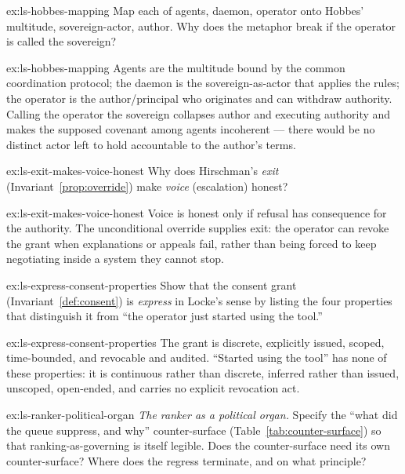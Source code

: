 \documentclass[11pt,a4paper]{article}
\theoremstyle{definition}
\theoremstyle{plain}
\newcounter{protocol}[section]
\begin{document}
\begin{pdexercise}[kind=Check,rating=1]{ex:ls-hobbes-mapping}
Map each of {agents, daemon, operator} onto Hobbes' {multitude, sovereign-actor,
author}. Why does the metaphor break if the operator is called the sovereign?
\end{pdexercise}
\begin{pdsolution}{ex:ls-hobbes-mapping}
Agents are the multitude bound by the common coordination protocol; the daemon is the sovereign-as-actor that applies the rules; the operator is the author/principal who originates and can withdraw authority. Calling the operator the sovereign collapses author and executing authority and makes the supposed covenant among agents incoherent --- there would be no distinct actor left to hold accountable to the author's terms.
\end{pdsolution}
\begin{pdexercise}[kind=Check,rating=1]{ex:ls-exit-makes-voice-honest}
Why does Hirschman's \emph{exit} (Invariant~\ref{prop:override}) make \emph{voice}
(escalation) honest?
\end{pdexercise}
\begin{pdsolution}{ex:ls-exit-makes-voice-honest}
Voice is honest only if refusal has consequence for the authority. The unconditional override supplies exit: the operator can revoke the grant when explanations or appeals fail, rather than being forced to keep negotiating inside a system they cannot stop.
\end{pdsolution}
\begin{pdexercise}[kind=Trace,rating=2]{ex:ls-express-consent-properties}
Show that the consent grant (Invariant~\ref{def:consent}) is \emph{express} in
Locke's sense by listing the four properties that distinguish it from ``the operator
just started using the tool.''
\end{pdexercise}
\begin{pdsolution}{ex:ls-express-consent-properties}
The grant is discrete, explicitly issued, scoped, time-bounded, and revocable and audited. ``Started using the tool'' has none of these properties: it is continuous rather than discrete, inferred rather than issued, unscoped, open-ended, and carries no explicit revocation act.
\end{pdsolution}
\begin{pdexercise}[kind=Open,rating=3]{ex:ls-ranker-political-organ}
\emph{The ranker as a political organ.} Specify the ``what did the
queue suppress, and why'' counter-surface (Table~\ref{tab:counter-surface})
so that ranking-as-governing is itself legible.
Does the counter-surface need its own counter-surface? Where does the regress
terminate, and on what principle?
\end{pdexercise}
\end{document}
